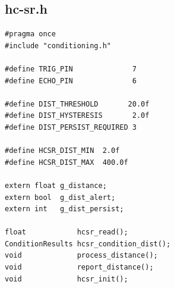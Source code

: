 \documentclass[12pt,a4paper]{article}
\begin{document}
\subsection{hc-sr.h}
\begin{lstlisting}
#pragma once
#include "conditioning.h"

#define TRIG_PIN              7
#define ECHO_PIN              6

#define DIST_THRESHOLD       20.0f
#define DIST_HYSTERESIS       2.0f
#define DIST_PERSIST_REQUIRED 3

#define HCSR_DIST_MIN  2.0f
#define HCSR_DIST_MAX  400.0f

extern float g_distance;
extern bool  g_dist_alert;
extern int   g_dist_persist;

float            hcsr_read();
ConditionResults hcsr_condition_dist();
void             process_distance();
void             report_distance();
void             hcsr_init();
\end{lstlisting}
\end{document}
